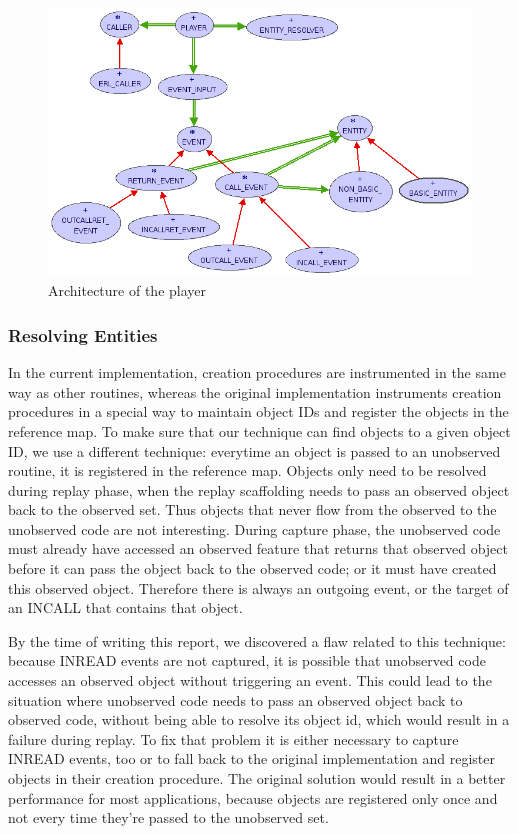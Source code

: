\begin{figure}[ht]
  \centering
  \includegraphics[width=1\textwidth]{illustrations/implementation_player.png}
  \caption{Architecture of the player}
  \label{fig:implementation_player}
\end{figure}


\subsubsection {Resolving Entities}
\label{lbl:entity_resolving}
In the current implementation, creation procedures are instrumented in the same way as other routines, whereas the original implementation instruments creation procedures in a special way to maintain object IDs and register the objects in the reference map. To make sure that our technique can find objects to a given object ID, we use a different technique: everytime an object is passed to an unobserved routine, it is registered in the reference map. Objects only need to be resolved during replay phase, when the replay scaffolding needs to pass an observed object back to the observed set. Thus objects that never flow from the observed to the unobserved code are not interesting. During capture phase, the unobserved code must already have accessed an observed feature that returns that observed object before it can pass the object back to the observed code; or it must have created this observed object.
Therefore there is always an outgoing event, or the target of an INCALL that contains that object.

By the time of writing this report, we discovered a flaw related to this technique: because INREAD events are not captured, it is possible that unobserved code accesses an observed object without triggering an event. This could lead to the situation where unobserved code needs to pass an observed object back to observed code, without being able to resolve its object id, which would result in a failure during replay. To fix that problem it is either necessary to capture INREAD events, too or to fall back to the original implementation and register objects in their creation procedure. The original solution would result in a better performance for most applications, because objects are registered only once and not every time they're passed to the unobserved set.


